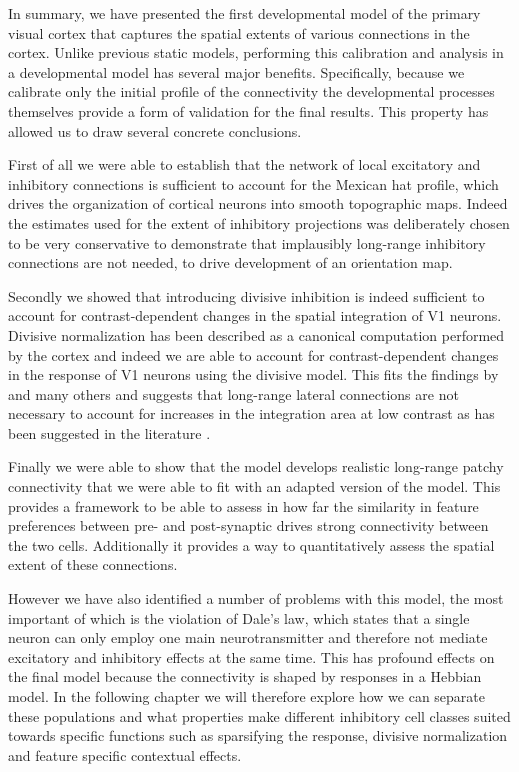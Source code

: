 In summary, we have presented the first developmental model of
the primary visual cortex that captures the spatial extents of various
connections in the cortex. Unlike previous static models, performing
this calibration and analysis in a developmental model has several major
benefits. Specifically, because we calibrate only the initial profile
of the connectivity the developmental processes themselves provide a
form of validation for the final results. This property has allowed us
to draw several concrete conclusions.

First of all we were able to establish that the network of local
excitatory and inhibitory connections is sufficient to account for the
Mexican hat profile, which drives the organization of cortical neurons
into smooth topographic maps. Indeed the estimates used for the extent
of inhibitory projections was deliberately chosen to be very
conservative to demonstrate that implausibly long-range inhibitory
connections are not needed, to drive development of an orientation map.

Secondly we showed that introducing divisive inhibition is indeed
sufficient to account for contrast-dependent changes in the spatial
integration of V1 neurons. Divisive normalization has been described
as a canonical computation performed by the cortex and indeed we are
able to account for contrast-dependent changes in the response of V1
neurons using the divisive model. This fits the findings by
\cite{Carandini2012} and many others and suggests that long-range
lateral connections are not necessary to account for increases in the
integration area at low contrast as has been suggested in the
literature \citep{Levitt2002, Schwabe2006}.

Finally we were able to show that the model develops realistic
long-range patchy connectivity that we were able to fit with an
adapted version of the \cite{Buzas2006} model. This provides a
framework to be able to assess in how far the similarity in feature
preferences between pre- and post-synaptic drives strong connectivity
between the two cells. Additionally it provides a way to
quantitatively assess the spatial extent of these connections.

However we have also identified a number of problems with this model,
the most important of which is the violation of Dale's law, which
states that a single neuron can only employ one main neurotransmitter
and therefore not mediate excitatory and inhibitory effects at the
same time. This has profound effects on the final model because the
connectivity is shaped by responses in a Hebbian model. In the
following chapter we will therefore explore how we can separate these
populations and what properties make different inhibitory cell classes
suited towards specific functions such as sparsifying the response,
divisive normalization and feature specific contextual effects.
